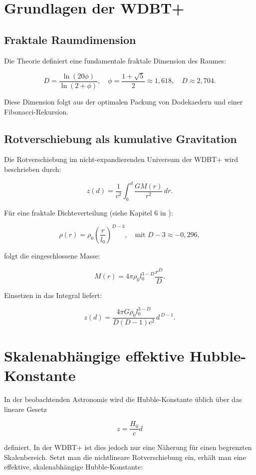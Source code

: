 \documentclass[11pt]{article}
\begin{document}
\section{Grundlagen der WDBT+}

\subsection{Fraktale Raumdimension}

Die Theorie definiert eine fundamentale fraktale Dimension des Raumes:

\[
D = \frac{\ln(20\phi)}{\ln(2 + \phi)}, \quad \phi = \frac{1 + \sqrt{5}}{2} \approx 1,618, \quad D \approx 2,704. \tag{1}
\]

Diese Dimension folgt aus der optimalen Packung von Dodekaedern und einer Fibonacci-Rekursion.

\subsection{Rotverschiebung als kumulative Gravitation}

Die Rotverschiebung im nicht-expandierenden Universum der WDBT+ wird beschrieben durch:

\[
z(d) = \frac{1}{c^2} \int_0^d \frac{GM(r)}{r^2} \, dr. \tag{2}
\]

Für eine fraktale Dichteverteilung (siehe Kapitel 6 in \cite{main}):

\[
\rho(r) = \rho_0 \left( \frac{r}{l_0} \right)^{D-3}, \quad \text{mit } D-3 \approx -0,296, \tag{3}
\]

folgt die eingeschlossene Masse:

\[
M(r) = 4\pi \rho_0 l_0^{3-D} \frac{r^D}{D}. \tag{4}
\]

Einsetzen in das Integral liefert:

\[
z(d) = \frac{4\pi G\rho_0 l_0^{3-D}}{D(D-1)c^2} \, d^{\,D-1}. \tag{5}
\]

\section{Skalenabhängige effektive Hubble-Konstante}

In der beobachtenden Astronomie wird die Hubble-Konstante üblich über das lineare Gesetz

\[
z = \frac{H_0}{c} d \tag{6}
\]

definiert. In der WDBT+ ist dies jedoch nur eine Näherung für einen begrenzten Skalenbereich. Setzt man die nichtlineare Rotverschiebung ein, erhält man eine effektive, skalenabhängige Hubble-Konstante:
\end{document}
